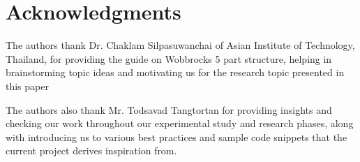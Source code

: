 \documentclass[11pt]{article}
\begin{document}
\section*{Acknowledgments}

The authors thank Dr. Chaklam Silpasuwanchai of Asian Institute of Technology, Thailand, for providing the guide on Wobbrocks 5 part structure, helping in brainstorming topic ideas and motivating us for the research topic presented in this paper

The authors also thank Mr. Todsavad Tangtortan for providing insights and checking our work throughout our experimental study and research phases, along with introducing us to various best practices and sample code snippets that the current project derives inspiration from.

%
%




\end{document}
